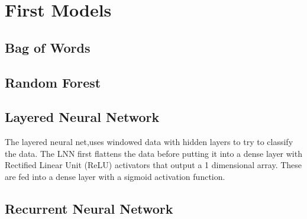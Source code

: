 \section{First Models}
\label{sec:first_models}

  \subsection{Bag of Words}
  \label{sec:bag_of_words}

  \subsection{Random Forest}
  \label{sec:random_forest}

  \subsection{Layered Neural Network}
  \label{sec:layered_neural_network}
  The layered neural net,uses windowed data with hidden layers to try to classify the data. The LNN first flattens the data before putting it into a dense layer with Rectified Linear Unit (ReLU) activators that output a 1 dimensional array. These are fed into a dense layer with a sigmoid activation function.

  \subsection{Recurrent Neural Network}
  \label{sec:recurrent_neural_network}